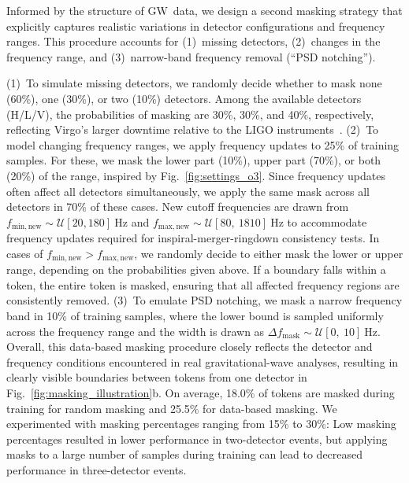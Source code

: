 Informed by the structure of GW~data, we design a second masking strategy that explicitly captures realistic variations in detector configurations and frequency ranges.
This procedure accounts for
(1)~missing detectors,
(2)~changes in the frequency range, and
(3)~narrow-band frequency removal (“PSD notching”).

(1)~To simulate missing detectors, we randomly decide whether to mask none (60\%), one (30\%), or two (10\%) detectors.
Among the available detectors (H/L/V), the probabilities of masking are 30\%, 30\%, and 40\%, respectively, reflecting Virgo’s larger downtime relative to the LIGO instruments~\citep{ligo_gwtc-3:2023}.
(2)~To model changing frequency ranges, we apply frequency updates to 25\% of training samples.
For these, we mask the lower part (10\%), upper part (70\%), or both (20\%) of the range, inspired by Fig.~\ref{fig:settings_o3}.
Since frequency updates often affect all detectors simultaneously, we apply the same mask across all detectors in 70\% of these cases.
New cutoff frequencies are drawn from $f_\mathrm{min,new} \sim \mathcal{U}[20,180]~\mathrm{Hz}$ and $f_\mathrm{max,new} \sim \mathcal{U}[80,~1810]~\mathrm{Hz}$ to accommodate frequency updates required for inspiral-merger-ringdown consistency tests.
In cases of $f_\mathrm{min,new} > f_\mathrm{max,new}$, we randomly decide to either mask the lower or upper range, depending on the probabilities given above.
If a boundary falls within a token, the entire token is masked, ensuring that all affected frequency regions are consistently removed.
(3)~To emulate PSD notching, we mask a narrow frequency band in 10\% of training samples, where the lower bound is sampled uniformly across the frequency range and the width is drawn as $\Delta f_\mathrm{mask} \sim \mathcal{U}[0,~10]~\mathrm{Hz}$.
Overall, this data-based masking procedure closely reflects the detector and frequency conditions encountered in real gravitational-wave analyses, resulting in clearly visible boundaries between tokens from one detector in Fig.~\ref{fig:masking_illustration}b.
On average, 18.0\% of tokens are masked during training for random masking and 25.5\% for data-based masking.
We experimented with masking percentages ranging from 15\% to 30\%: Low masking percentages resulted in lower performance in two-detector events, but applying masks to a large number of samples during training can lead to decreased performance in three-detector events.


